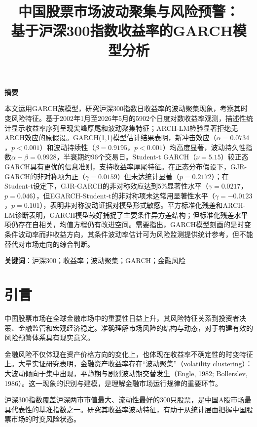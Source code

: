 \documentclass[11pt,a4paper]{article}
\title{\textbf{中国股票市场波动聚集与风险预警：\\基于沪深300指数收益率的GARCH模型分析}}
\author{}
\date{}
\begin{document}
\maketitle

\begin{center}
\large\textbf{摘\quad 要}
\end{center}

本文运用GARCH族模型，研究沪深300指数日收益率的波动聚集现象，考察其时变风险特征。基于2002年1月至2026年5月的5902个日度对数收益率观测，描述性统计显示收益率序列呈现尖峰厚尾和波动聚集特征；ARCH-LM检验显著拒绝无ARCH效应的原假设。GARCH(1,1)模型估计结果表明，新冲击效应（\(\alpha=0.0734\)，\(p<0.001\)）和波动持续性（\(\beta=0.9195\)，\(p<0.001\)）均高度显著，波动持久性指数\(\alpha+\beta=0.9928\)，半衰期约96个交易日。Student-t GARCH（\(\nu=5.15\)）较正态GARCH具有更优的信息准则，支持收益率厚尾特征。在正态分布假设下，GJR-GARCH的非对称项为正（\(\gamma=0.0159\)）但未达统计显著（\(p=0.2172\)）；在Student-t设定下，GJR-GARCH的非对称效应达到5\%显著性水平（\(\gamma=0.0217\)，\(p=0.046\)），但EGARCH-Student-t的非对称项未达常用显著性水平（\(\gamma=-0.0123\)，\(p=0.101\)），表明非对称波动证据对模型形式敏感。平方标准化残差和ARCH-LM诊断表明，GARCH模型较好捕捉了主要条件异方差结构；但标准化残差水平项仍存在自相关，均值方程仍有改进空间。需要指出，GARCH模型刻画的是时变条件波动率而非收益方向，其条件波动率估计可为风险监测提供统计参考，但不能替代对市场走向的综合判断。

\vspace{1em}
\textbf{关键词}：沪深300；收益率；波动聚集；GARCH；金融风险

\newpage

\section{引言}

中国股票市场在全球金融市场中的重要性日益上升，其风险特征关系到投资者决策、金融监管和宏观经济稳定。准确理解市场风险的结构与动态，对于构建有效的风险预警体系具有现实意义。

金融风险不仅体现在资产价格方向的变化上，也体现在收益率不确定性的时变特征上。大量实证研究表明，金融资产收益率存在“波动聚集”（volatility clustering）：大波动倾向于集中出现，平静期与剧烈波动期交替发生（Engle, 1982; Bollerslev, 1986）。这一现象的识别与建模，是理解金融市场运行规律的重要环节。

沪深300指数覆盖沪深两市市值最大、流动性最好的300只股票，是中国A股市场最具代表性的基准指数之一。研究其收益率波动特征，有助于从统计层面把握中国股票市场的时变风险状态。
\end{document}
